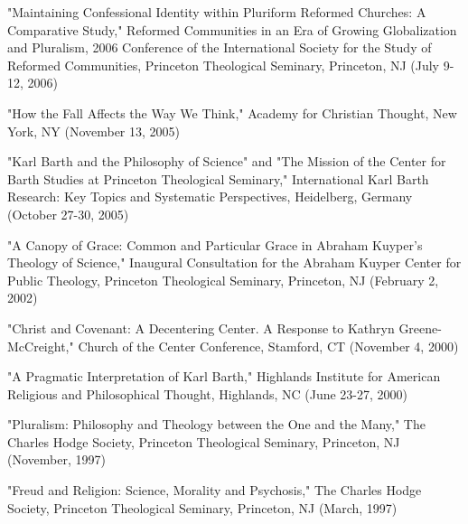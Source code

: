 \documentclass[10pt]{res} %
\begin{document}
\begin{resume}
\begin{hangparas}{.25in}{1}"Maintaining Confessional Identity within Pluriform Reformed Churches: A Comparative Study," Reformed Communities in an Era of Growing Globalization and Pluralism, 2006 Conference of the International Society for the Study of Reformed Communities, Princeton Theological Seminary, Princeton, NJ (July 9-12, 2006)\end{hangparas}

\begin{hangparas}{.25in}{1}"How the Fall Affects the Way We Think," Academy for Christian Thought, New York, NY (November 13, 2005)\end{hangparas}

\begin{hangparas}{.25in}{1}"Karl Barth and the Philosophy of Science" and "The Mission of the Center for Barth Studies at Princeton Theological Seminary," International Karl Barth Research: Key Topics and Systematic Perspectives, Heidelberg, Germany (October 27-30, 2005)\end{hangparas}

\begin{hangparas}{.25in}{1}"A Canopy of Grace: Common and Particular Grace in Abraham Kuyper’s Theology of Science," Inaugural Consultation for the Abraham Kuyper Center for Public Theology, Princeton Theological Seminary, Princeton, NJ (February 2, 2002)\end{hangparas}

\begin{hangparas}{.25in}{1}"Christ and Covenant: A Decentering Center. A Response to Kathryn Greene-McCreight," Church of the Center Conference, Stamford, CT (November 4, 2000)\end{hangparas}

\begin{hangparas}{.25in}{1}"A Pragmatic Interpretation of Karl Barth," Highlands Institute for American Religious and Philosophical Thought, Highlands, NC (June 23-27, 2000)\end{hangparas}

\begin{hangparas}{.25in}{1}"Pluralism: Philosophy and Theology between the One and the Many," The Charles Hodge Society, Princeton Theological Seminary, Princeton, NJ (November, 1997)\end{hangparas}

\begin{hangparas}{.25in}{1}"Freud and Religion: Science, Morality and Psychosis," The Charles Hodge Society, Princeton Theological Seminary, Princeton, NJ (March, 1997)\end{hangparas}


\end{resume}
\end{document}
